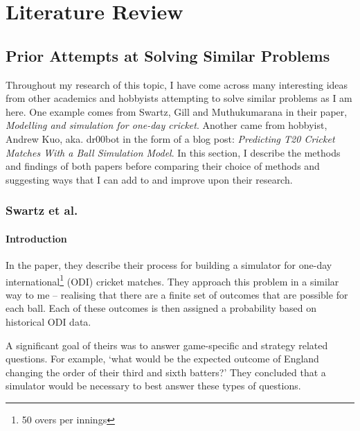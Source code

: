 \titleformat{\chapter}[hang]{\Huge\bfseries}{\thechapter\hsp\textcolor{gray75}{|}\hsp}{0pt}{\Huge\bfseries}
\chapter{Literature Review}
\label{chap: Lit}

\section{Prior Attempts at Solving Similar Problems}

Throughout my research of this topic, I have come across many interesting ideas from other academics and hobbyists attempting to solve similar problems as I am here. One example comes from Swartz, Gill and Muthukumarana \cite{swartz_modelling_2009} in their paper, \textit{Modelling and simulation for one-day cricket}. Another came from hobbyist, Andrew Kuo, aka. dr00bot \cite{kuo_predicting_2021} in the form of a blog post: \textit{Predicting T20 Cricket Matches With a Ball Simulation Model}. In this section, I describe the methods and findings of both papers before comparing their choice of methods and suggesting ways that I can add to and improve upon their research.

\subsection{Swartz et al.}

\subsubsection{Introduction}

In the paper, they describe their process for building a simulator for one-day international\footnote{50 overs per innings} (ODI) cricket matches. They approach this problem in a similar way to me – realising that there are a finite set of outcomes that are possible for each ball. Each of these outcomes is then assigned a probability based on historical ODI data.

A significant goal of theirs was to answer game-specific and strategy related questions. For example, ‘what would be the expected outcome of England changing the order of their third and sixth batters?’ They concluded that a simulator would be necessary to best answer these types of questions.

